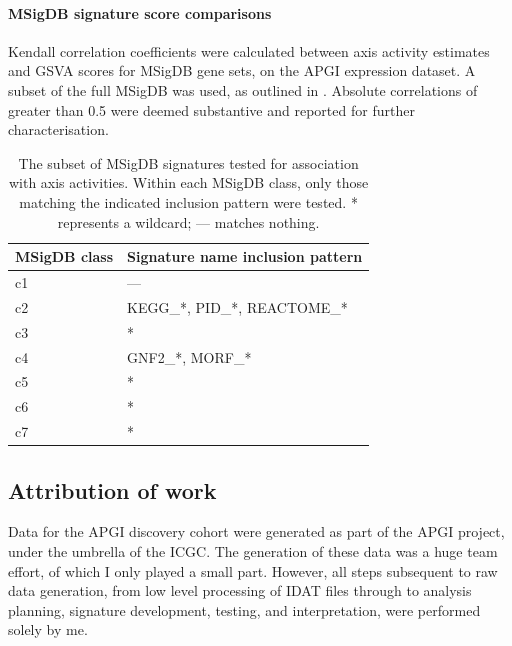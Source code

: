 \documentclass[dissertation.tex]{subfiles}
\begin{document}
\paragraph{\acrshort{MSigDB} signature score comparisons}
Kendall correlation coefficients were calculated between axis activity estimates and \gls{GSVA} scores for \gls{MSigDB} gene sets, on the \gls{APGI} expression dataset.  A subset of the full \gls{MSigDB} was used, as outlined in .  Absolute correlations of greater than 0.5 were deemed substantive and reported for further characterisation.

\begin{table}[h]
\centering
\caption[Subset of \acrshort{MSigDB} signatures tested for association with axis activities]{The subset of \acrshort{MSigDB} signatures tested for association with axis activities.  Within each \gls{MSigDB} class, only those matching the indicated inclusion pattern were tested.  * represents a wildcard; --- matches nothing.}\label{sigs-msigdb-subset}
\begin{tabular}{@{}ll@{}}
\toprule
MSigDB class & Signature name inclusion pattern   \\ \midrule
c1           & ---                                \\
c2           & KEGG\_*, PID\_*, REACTOME\_*       \\
c3           & *                                  \\
c4           & GNF2\_*, MORF\_*                   \\
c5           & *                                  \\
c6           & *                                  \\
c7           & *                                  \\ \bottomrule
\end{tabular}
\end{table}


\subsection{Attribution of work}
Data for the \gls{APGI} discovery cohort were generated as part of the \gls{APGI} project, under the umbrella of the \gls{ICGC}.  The generation of these data was a huge team effort, of which I only played a small part.  However, all steps subsequent to raw data generation, from low level processing of \gls{IDAT} files through to analysis planning, signature development, testing, and interpretation, were performed solely by me.
\end{document}
